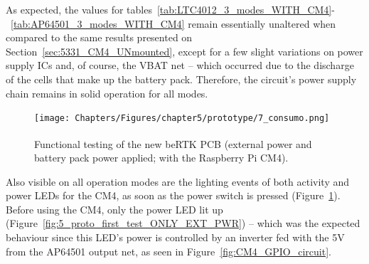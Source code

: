 \begingroup
\begin{table}[H]
	\caption{AP64501 circuit's most relevant voltages expected and measured, for all operational modes, with the CM4 mounted on the prototype.}
	\label{tab:AP64501_3_modes_WITH_CM4}
	\centering
\end{table}
\endgroup%

As expected, the values for tables~\ref{tab:LTC4012_3_modes_WITH_CM4}-~\ref{tab:AP64501_3_modes_WITH_CM4} remain essentially unaltered when compared to the same results presented on Section~\ref{sec:5331_CM4_UNmounted}, except for a few slight variations on power supply ICs and, of course, the VBAT net -- which occurred due to the discharge of the cells that make up the battery pack.
Therefore, the circuit's power supply chain remains in solid operation for all modes.

\begin{figure}[h]
	\centering
	\texttt{[image: Chapters/Figures/chapter5/prototype/7\_consumo.png]}
	\caption{Functional testing of the new beRTK\textsuperscript{\textregistered} PCB (external power and battery pack power applied; with the Raspberry Pi CM4).}
	\label{fig:7_consumo}
\end{figure}%

Also visible on all operation modes are the lighting events of both activity and power LEDs for the CM4, as soon as the power switch is pressed (Figure~\ref{fig:7_consumo}). Before using the CM4, only the power LED lit up (Figure~\ref{fig:5_proto_first_test_ONLY_EXT_PWR}) -- which was the expected behaviour since this LED's power is controlled by an inverter fed with the 5V from the AP64501 output net, as seen in Figure~\ref{fig:CM4_GPIO_circuit}.

